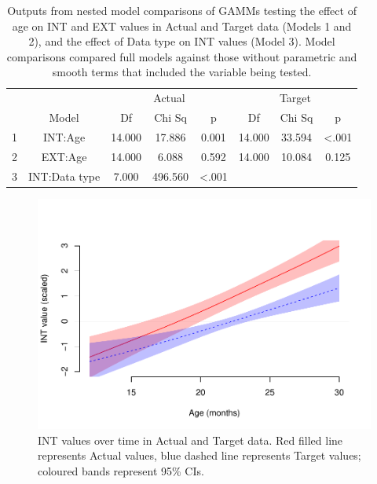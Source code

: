 \documentclass[
  man]{apa6}
\begin{document}
\begin{longtable}[t]{cccccccc}
\caption{\label{tab:table-GAMM-outputs}Outputs from nested model comparisons of GAMMs testing the effect of age on INT and EXT values in Actual and Target data (Models 1 and 2), and the effect of Data type on INT values (Model 3). Model comparisons compared full models against those without parametric and smooth terms that included the variable being tested.}\\
\toprule
\multicolumn{2}{c}{ } & \multicolumn{3}{c}{Actual} & \multicolumn{3}{c}{Target} \\
\cmidrule(l{3pt}r{3pt}){3-5} \cmidrule(l{3pt}r{3pt}){6-8}
  & Model & Df & Chi Sq & p & Df & Chi Sq & p\\
\midrule
1 & INT:Age & 14.000 & 17.886 & 0.001 & 14.000 & 33.594 & <.001\\
2 & EXT:Age & 14.000 & 6.088 & 0.592 & 14.000 & 10.084 & 0.125\\
3 & INT:Data type & 7.000 & 496.560 & <.001 &  &  & \\
\bottomrule
\end{longtable}

\begin{figure}
\centering
\includegraphics{PhonNetworksProj-accepted_files/figure-latex/figure-GAMM-INT-1.pdf}
\caption{\label{fig:figure-GAMM-INT}INT values over time in Actual and Target data. Red filled line represents Actual values, blue dashed line represents Target values; coloured bands represent 95\% CIs.}
\end{figure}
\end{document}
